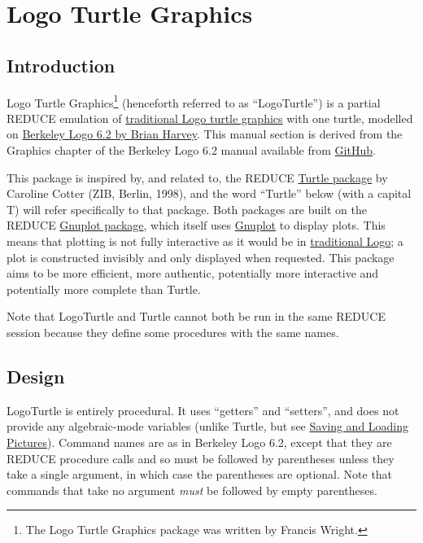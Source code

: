 \section{Logo Turtle Graphics}

\subsection{Introduction}

Logo Turtle Graphics\footnote{The Logo Turtle Graphics package was
written by Francis Wright.} (henceforth referred to as ``LogoTurtle'')
is a partial REDUCE emulation of
\href{https://en.wikipedia.org/wiki/Turtle_graphics}{traditional Logo
  turtle graphics} with one turtle, modelled on
\href{http://people.eecs.berkeley.edu/~bh/logo.html}{Berkeley Logo 6.2
  by Brian Harvey}.  This manual section is derived from the Graphics
chapter of the Berkeley Logo 6.2 manual available from
\href{https://github.com/jrincayc/ucblogo-code}{GitHub}.

This package is inspired by, and related to, the REDUCE
\hyperref[package:TURTLE]{Turtle package} by Caroline Cotter (ZIB,
Berlin, 1998), and the word ``Turtle'' below (with a capital T) will
refer specifically to that package.  Both packages are built on the
REDUCE \hyperref[package:GNUPLOT]{Gnuplot package}, which itself uses
\href{http://gnuplot.info/}{Gnuplot} to display plots.  This means
that plotting is not fully interactive as it would be in
\href{https://en.wikipedia.org/wiki/Logo_(programming_language)}{traditional
  Logo}; a plot is constructed invisibly and only displayed when
requested.  This package aims to be more efficient, more authentic,
potentially more interactive and potentially more complete than
Turtle.

Note that LogoTurtle and Turtle cannot both be run in the same REDUCE
session because they define some procedures with the same names.

\subsection{Design}

LogoTurtle is entirely procedural.  It uses ``getters'' and
``setters'', and does not provide any algebraic-mode variables (unlike
Turtle, but see \hyperref[logoturtle:SLP]{Saving and Loading
  Pictures}).  Command names are as in Berkeley Logo 6.2, except that
they are REDUCE procedure calls and so must be followed by parentheses
unless they take a single argument, in which case the parentheses are
optional.  Note that commands that take no argument \emph{must} be
followed by empty parentheses.

